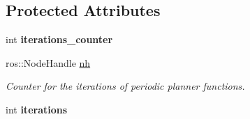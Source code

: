 \subsection*{Protected Attributes}
\begin{DoxyCompactItemize}
\item 
int {\bfseries iterations\+\_\+counter}\hypertarget{classPlanner_a99b577203757a2466e8a3424c28d3449}{}\label{classPlanner_a99b577203757a2466e8a3424c28d3449}

\item 
ros\+::\+Node\+Handle \hyperlink{classPlanner_a9714d036f444a07ce90be8d135b9a40c}{nh}\hypertarget{classPlanner_a9714d036f444a07ce90be8d135b9a40c}{}\label{classPlanner_a9714d036f444a07ce90be8d135b9a40c}

\begin{DoxyCompactList}\small\item\em Counter for the iterations of periodic planner functions. \end{DoxyCompactList}\item 
int {\bfseries iterations}\hypertarget{classPlanner_a19220ea8cd70f4f3bfa3e35e1250ed00}{}\label{classPlanner_a19220ea8cd70f4f3bfa3e35e1250ed00}

\end{DoxyCompactItemize}
